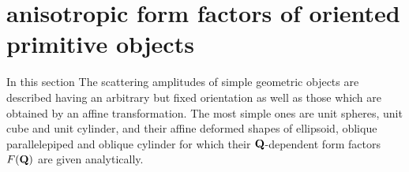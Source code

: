 \clearpage
\section{anisotropic form factors of oriented primitive objects}
\label{ch:OPO}

In this section The scattering amplitudes of simple geometric objects are described having an arbitrary but fixed orientation as well as those which are obtained by an affine transformation. The most simple ones are unit spheres, unit cube and unit cylinder, and their affine deformed shapes of ellipsoid,  oblique parallelepiped and  oblique cylinder for which their $\B{Q}$-dependent form factors $F(\B{Q})$ are given analytically.

